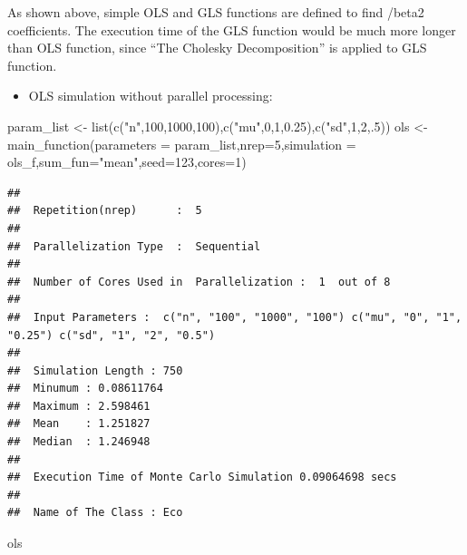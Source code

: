 \documentclass[11pt,a4paper]{article}
\newenvironment{Shaded}{\begin{snugshade}}{\end{snugshade}}
\newcommand{\AttributeTok}[1]{\textcolor[rgb]{0.77,0.63,0.00}{#1}}
\newcommand{\DecValTok}[1]{\textcolor[rgb]{0.00,0.00,0.81}{#1}}
\newcommand{\FloatTok}[1]{\textcolor[rgb]{0.00,0.00,0.81}{#1}}
\newcommand{\FunctionTok}[1]{\textcolor[rgb]{0.00,0.00,0.00}{#1}}
\newcommand{\NormalTok}[1]{#1}
\newcommand{\OtherTok}[1]{\textcolor[rgb]{0.56,0.35,0.01}{#1}}
\newcommand{\StringTok}[1]{\textcolor[rgb]{0.31,0.60,0.02}{#1}}
\begin{document}
As shown above, simple OLS and GLS functions are defined to find /beta2
coefficients. The execution time of the GLS function would be much more
longer than OLS function, since ``The Cholesky Decomposition'' is
applied to GLS function.

\begin{itemize}

\item
  OLS simulation without parallel processing:
\end{itemize}

\begin{Shaded}
\begin{Highlighting}[]
\NormalTok{ param\_list }\OtherTok{\textless{}{-}} \FunctionTok{list}\NormalTok{(}\FunctionTok{c}\NormalTok{(}\StringTok{"n"}\NormalTok{,}\DecValTok{100}\NormalTok{,}\DecValTok{1000}\NormalTok{,}\DecValTok{100}\NormalTok{),}\FunctionTok{c}\NormalTok{(}\StringTok{"mu"}\NormalTok{,}\DecValTok{0}\NormalTok{,}\DecValTok{1}\NormalTok{,}\FloatTok{0.25}\NormalTok{),}\FunctionTok{c}\NormalTok{(}\StringTok{"sd"}\NormalTok{,}\DecValTok{1}\NormalTok{,}\DecValTok{2}\NormalTok{,.}\DecValTok{5}\NormalTok{))}
\NormalTok{ols }\OtherTok{\textless{}{-}} \FunctionTok{main\_function}\NormalTok{(}\AttributeTok{parameters =}\NormalTok{ param\_list,}\AttributeTok{nrep=}\DecValTok{5}\NormalTok{,}\AttributeTok{simulation =}\NormalTok{ ols\_f,}\AttributeTok{sum\_fun=}\StringTok{"mean"}\NormalTok{,}\AttributeTok{seed=}\DecValTok{123}\NormalTok{,}\AttributeTok{cores=}\DecValTok{1}\NormalTok{)}
\end{Highlighting}
\end{Shaded}

\begin{verbatim}
## 
##  Repetition(nrep)      :  5 
## 
##  Parallelization Type  :  Sequential 
## 
##  Number of Cores Used in  Parallelization :  1  out of 8 
## 
##  Input Parameters :  c("n", "100", "1000", "100") c("mu", "0", "1", "0.25") c("sd", "1", "2", "0.5") 
## 
##  Simulation Length : 750 
##  Minumum : 0.08611764 
##  Maximum : 2.598461 
##  Mean    : 1.251827 
##  Median  : 1.246948 
## 
##  Execution Time of Monte Carlo Simulation 0.09064698 secs 
## 
##  Name of The Class : Eco
\end{verbatim}

\begin{Shaded}
\begin{Highlighting}[]
\NormalTok{ols}
\end{Highlighting}
\end{Shaded}
\end{document}
